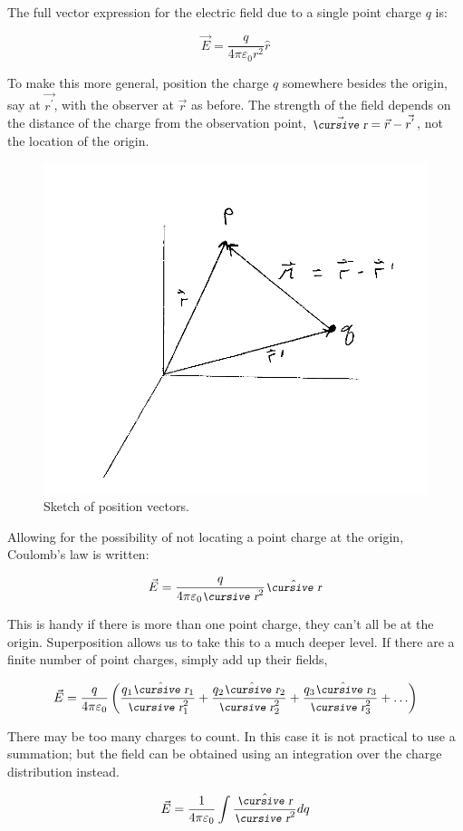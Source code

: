 \documentclass[12pt]{article}
\begin{document}
\begin{flushleft}
The full vector expression for the electric field due to a single point charge $q$ is:

\[
\vec{E} = \frac{q}{4 \pi \varepsilon_{0} r^{2}} \hat{r}
\]

To make this more general, position the charge $q$ somewhere besides the origin, say at $\vec{r^{'}}$, with the observer at $\vec{r}$ as before.  The strength of the field depends on the distance of the charge from the observation point, $\vec{\text{\small\slshape\cursive r}}=\vec{r}-\vec{r^{'}}$, not the location of the origin.

\begin{figure}[h]
\centering
\includegraphics*[trim=0cm 0cm 0cm 0cm, clip=true, width=0.4\columnwidth]{scriptr.png}
\caption{Sketch of position vectors.}
\label{fig:scriptr}
\end{figure}

Allowing for the possibility of not locating a point charge at the origin, Coulomb's law is written:

\[
\vec{E} = \frac{q}{4 \pi \varepsilon_{0} \text{\small\slshape\cursive r}^{2}} \hat{\text{\small\slshape\cursive r}}
\]

This is handy if there is more than one point charge, they can't all be at the origin.  Superposition allows us to take this to a much deeper level.  If there are a finite number of point charges, simply add up their fields,

\[
\vec{E} = \frac{q}{4 \pi \varepsilon_{0}} \left( \frac{ q_{1}\hat{\text{\small\slshape\cursive r}}_{1} }{ \text{\small\slshape\cursive r}_{1}^{2} }  + \frac{ q_{2}\hat{\text{\small\slshape\cursive r}}_{2} }{ \text{\small\slshape\cursive r}_{2}^{2} } + \frac{ q_{3}\hat{\text{\small\slshape\cursive r}}_{3} }{ \text{\small\slshape\cursive r}_{3}^{2} } + \ldots \right)
\]

There may be too many charges to count.  In this case it is not practical to use a summation; but the field can  be obtained using an integration over the charge distribution instead.

\begin{equation}
\vec{E}=\frac{1}{4\pi \varepsilon_{0}} \int \frac{ \hat{\text{\small\slshape\cursive r}} }{\text{\small\slshape\cursive r}^{2}} dq
\label{eq:intcoul}
\end{equation}


\end{flushleft}
\end{document}
